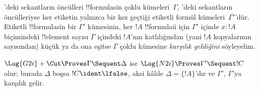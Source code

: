 \documentclass[../../../include/open-logic-section]{subfiles}
\begin{document}


'deki sekantların öncülleri !!{formula}s{}in çoklu kümeleri~$\Gamma$,
'deki sekantların öncülleriyse her etiketin yalnızca bir kez geçtiği
etiketli formül kümeleri~$\Gamma'$'dür. Etiketli !!{formula}s{}in bir
$\Gamma'$ kümesinin, her $!A$ !!{formula}{}ü için $\Gamma'$ içinde $x : !A$
biçimindeki !!{element} sayısı $\Gamma$ içindeki $!A$'nın katlılığından (yani
$!A$ kopyalarının sayısından) küçük ya da ona eşitse $\Gamma$ çoklu kümesine
\emph{karşılık geldiğini} söyleyelim.

\begin{prop}
$\Log{G2i} + \Cut \Proves \Gamma \Sequent \Delta$ ise $\Log{N2i}
\Proves \Gamma' \Sequent !C$ olur; burada $\Delta$ boşsa $!C \ident \lfalse$,
aksi hâlde $\Delta = \{!A\}$'dır ve $\Gamma'$, $\Gamma$'ya karşılık gelir.
\end{prop}
\end{document}
